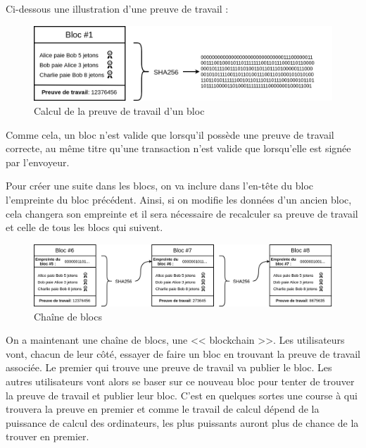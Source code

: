 \pagebreak

Ci-dessous une illustration d'une preuve de travail :

\begin{figure}[H]
  \centering
  \includegraphics[width=\textwidth]{images/crypto_8}
  \caption{Calcul de la preuve de travail d'un bloc}
\end{figure}

Comme cela, un bloc n'est valide que lorsqu'il possède une preuve de travail correcte, au même titre qu'une transaction n'est valide que lorsqu'elle est signée par l'envoyeur.

Pour créer une suite dans les blocs, on va inclure dans l'en-tête du bloc l'empreinte du bloc précédent. Ainsi, si on modifie les données d'un ancien bloc, cela changera son empreinte et il sera nécessaire de recalculer sa preuve de travail et celle de tous les blocs qui suivent.

\begin{figure}[H]
  \centering
  \includegraphics[width=\textwidth]{images/crypto_9}
  \caption{Chaîne de blocs}
\end{figure}

On a maintenant une chaîne de blocs, une << blockchain >>. Les utilisateurs vont, chacun de leur côté, essayer de faire un bloc en trouvant la preuve de travail associée. Le premier qui trouve une preuve de travail va publier le bloc. Les autres utilisateurs vont alors se baser sur ce nouveau bloc pour tenter de trouver la preuve de travail et publier leur bloc. C'est en quelques sortes une course à qui trouvera la preuve en premier et comme le travail de calcul dépend de la puissance de calcul des ordinateurs, les plus puissants auront plus de chance de la trouver en premier. 

